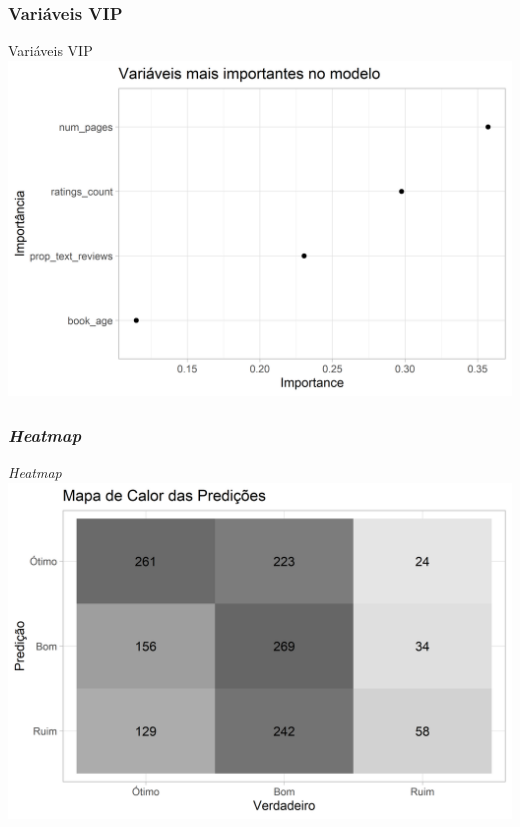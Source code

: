 \documentclass[
  9 pt,
  ignorenonframetext,
]{beamer}
\begin{document}
\hypertarget{variuxe1veis-vip}{%
\subsubsection{Variáveis VIP}\label{variuxe1veis-vip}}

\begin{frame}{Variáveis VIP}
\includegraphics{apresentacao_files/figure-beamer/unnamed-chunk-22-1.png}
\end{frame}

\hypertarget{heatmap}{%
\subsubsection{\texorpdfstring{\emph{Heatmap}}{Heatmap}}\label{heatmap}}

\begin{frame}{\emph{Heatmap}}
\includegraphics{apresentacao_files/figure-beamer/unnamed-chunk-23-1.png}
\end{frame}
\end{document}
